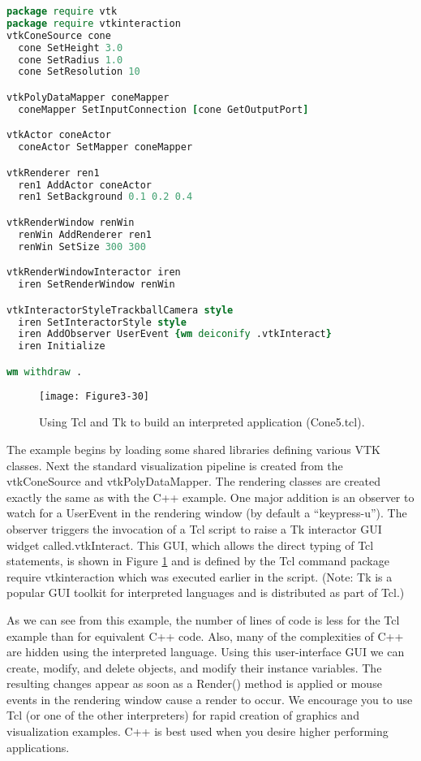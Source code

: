 \begin{lstlisting}[language=TCL, caption={Cone5.tcl}]
package require vtk
package require vtkinteraction
vtkConeSource cone
  cone SetHeight 3.0
  cone SetRadius 1.0
  cone SetResolution 10

vtkPolyDataMapper coneMapper
  coneMapper SetInputConnection [cone GetOutputPort]

vtkActor coneActor
  coneActor SetMapper coneMapper

vtkRenderer ren1
  ren1 AddActor coneActor
  ren1 SetBackground 0.1 0.2 0.4

vtkRenderWindow renWin
  renWin AddRenderer ren1
  renWin SetSize 300 300

vtkRenderWindowInteractor iren
  iren SetRenderWindow renWin

vtkInteractorStyleTrackballCamera style
  iren SetInteractorStyle style
  iren AddObserver UserEvent {wm deiconify .vtkInteract}
  iren Initialize

wm withdraw .
\end{lstlisting}

\begin{figure}[!htb]
  \centering
  \texttt{[image: Figure3-30]}\\
  \caption{Using Tcl and Tk to build an interpreted application (Cone5.tcl).}\label{fig:Figure3-30}
\end{figure}

The example begins by loading some shared libraries defining various VTK classes. Next the standard visualization pipeline is created from the vtkConeSource and vtkPolyDataMapper. The rendering classes are created exactly the same as with the C++ example. One major addition is an observer to watch for a UserEvent in the rendering window (by default a ``keypress-u''). The observer triggers the invocation of a Tcl script to raise a Tk interactor GUI widget called.vtkInteract. This GUI, which allows the direct typing of Tcl statements, is shown in Figure \ref{fig:Figure3-30} and is defined by the Tcl command package require vtkinteraction which was executed earlier in the script. (Note: Tk is a popular GUI toolkit for interpreted languages and is distributed as part of Tcl.) 

As we can see from this example, the number of lines of code is less for the Tcl example than for equivalent C++ code. Also, many of the complexities of C++ are hidden using the interpreted language. Using this user-interface GUI we can create, modify, and delete objects, and modify their instance variables. The resulting changes appear as soon as a Render() method is applied or mouse events in the rendering window cause a render to occur. We encourage you to use Tcl (or one of the other interpreters) for rapid creation of graphics and visualization examples. C++ is best used when you desire higher performing applications.

